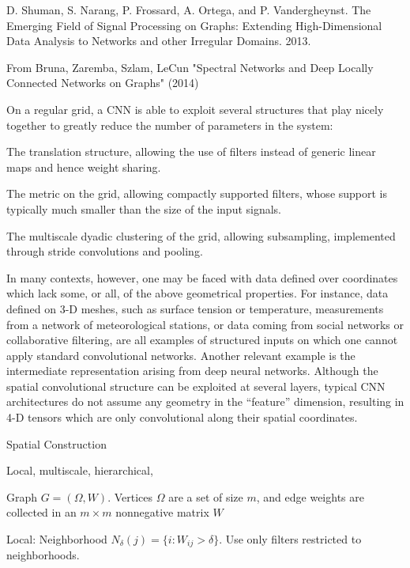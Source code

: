 \documentclass[english]{article}
\begin{document}
D. Shuman, S. Narang, P. Frossard, A. Ortega, and P. Vandergheynst. The Emerging Field of Signal
Processing on Graphs: Extending High-Dimensional Data Analysis to Networks and other Irregular Domains. 2013.

\item From Bruna, Zaremba, Szlam, LeCun "Spectral Networks and Deep Locally Connected Networks on Graphs" (2014)

On a regular grid, a CNN is able to exploit several structures that play nicely together to greatly
reduce the number of parameters in the system:

\bitem 
\item  The translation structure, allowing the use of filters instead of generic linear maps and
hence weight sharing.
\item  The metric on the grid, allowing compactly supported filters, whose support is typically
much smaller than the size of the input signals.
\item  The multiscale dyadic clustering of the grid, allowing subsampling, implemented through
stride convolutions and pooling.
\eitem 


In many contexts, however, one may be faced with data defined over coordinates which lack some,
or all, of the above geometrical properties. For instance, data defined on 3-D meshes, such as
surface tension or temperature, measurements from a network of meteorological stations, or data
coming from social networks or collaborative filtering, are all examples of structured inputs on which
one cannot apply standard convolutional networks. Another relevant example is the intermediate
representation arising from deep neural networks. Although the spatial convolutional structure can
be exploited at several layers, typical CNN architectures do not assume any geometry in the “feature”
dimension, resulting in 4-D tensors which are only convolutional along their spatial coordinates.

\item Spatial Construction

\bitem 

\item Local, multiscale, hierarchical,

\item Graph $G = (\Omega, W)$. Vertices $\Omega$ are a set of size $m$, and edge weights are collected in an  $m\times m$ nonnegative matrix  $W$

\item Local: Neighborhood $N_\delta(j) = \{i:W_{ij}>\delta\}$. Use only filters restricted to neighborhoods.
\end{document}

